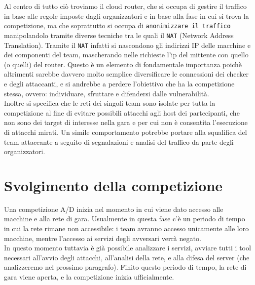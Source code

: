 Al centro di tutto ciò troviamo il cloud router, che si occupa di gestire il traffico in base alle regole imposte dagli organizzatori e in base alla fase in cui si trova la competizione, ma che soprattutto si occupa di \texttt{anonimizzare il traffico} manipolandolo tramite diverse tecniche tra le quali il \texttt{NAT} (Network Address Translation). Tramite il \texttt{NAT} infatti si nascondono gli indirizzi IP delle macchine e dei componenti del team, mascherando nelle richieste l'ip del mittente con quello (o quelli) del router. Questo è un elemento di fondamentale importanza poichè altrimenti sarebbe davvero molto semplice diversificare le connessioni dei checker e degli attaccanti, e si andrebbe a perdere l'obiettivo che ha la competizione stessa, ovvero: individuare, sfruttare e difendersi dalle vulnerabilità.\\

Inoltre si specifica che le reti dei singoli team sono isolate per tutta la competizione al fine di evitare possibili attacchi agli host dei partecipanti, che non sono dei target di interesse nella gara e per cui non è consentita l'esecuzione di attacchi mirati.
Un simile comportamento potrebbe portare alla squalifica del team attaccante a seguito di segnalazioni e analisi del traffico da parte degli organizzatori.

\section{Svolgimento della competizione}

Una competizione A/D inizia nel momento in cui viene dato accesso alle macchine e alla rete di gara. Usualmente in questa fase c'è un periodo di tempo in cui la rete rimane non accessibile: i team avranno accesso unicamente alle loro macchine, mentre l'accesso ai servizi degli avversari verrà negato.\\

In questo momento tuttavia è già possibile analizzare i servizi, avviare tutti i tool necessari all'avvio degli attacchi, all'analisi della rete, e alla difesa del server (che analizzeremo nel prossimo paragrafo). Finito questo periodo di tempo, la rete di gara viene aperta, e la competizione inizia ufficialmente.\\

